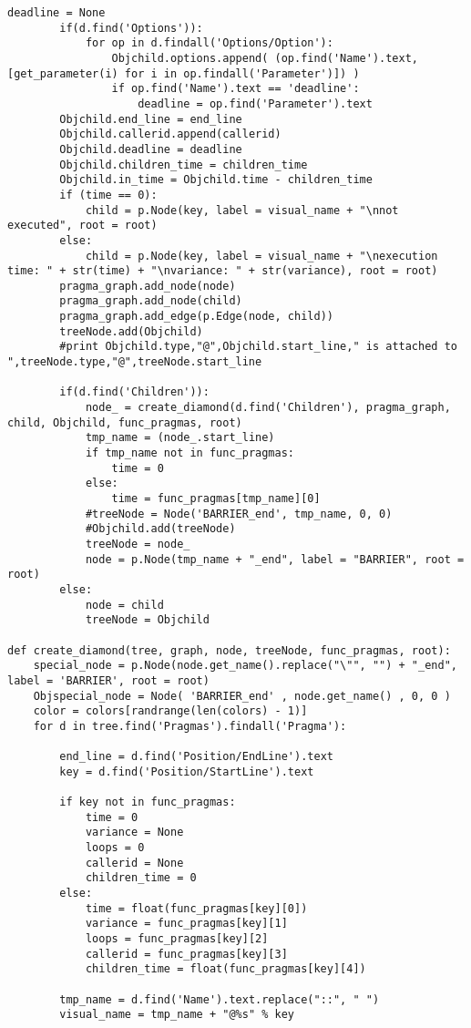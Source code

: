 \documentclass[a4paper,10pt,twoside]{book}
\begin{document}
\begin{lstlisting}[language=CCC, caption=pargraph.py]
		deadline = None
		if(d.find('Options')):
			for op in d.findall('Options/Option'):
				Objchild.options.append( (op.find('Name').text,[get_parameter(i) for i in op.findall('Parameter')]) )
				if op.find('Name').text == 'deadline':
					deadline = op.find('Parameter').text
		Objchild.end_line = end_line
		Objchild.callerid.append(callerid)
		Objchild.deadline = deadline
		Objchild.children_time = children_time
		Objchild.in_time = Objchild.time - children_time
		if (time == 0):
			child = p.Node(key, label = visual_name + "\nnot executed", root = root)
		else:
			child = p.Node(key, label = visual_name + "\nexecution time: " + str(time) + "\nvariance: " + str(variance), root = root)
		pragma_graph.add_node(node)
		pragma_graph.add_node(child)
		pragma_graph.add_edge(p.Edge(node, child))
		treeNode.add(Objchild)
		#print Objchild.type,"@",Objchild.start_line," is attached to ",treeNode.type,"@",treeNode.start_line

		if(d.find('Children')):
			node_ = create_diamond(d.find('Children'), pragma_graph, child, Objchild, func_pragmas, root)
			tmp_name = (node_.start_line)
			if tmp_name not in func_pragmas:
				time = 0
			else:
				time = func_pragmas[tmp_name][0]
			#treeNode = Node('BARRIER_end', tmp_name, 0, 0)
			#Objchild.add(treeNode)
			treeNode = node_
			node = p.Node(tmp_name + "_end", label = "BARRIER", root = root)
		else:
			node = child
			treeNode = Objchild

def create_diamond(tree, graph, node, treeNode, func_pragmas, root):
	special_node = p.Node(node.get_name().replace("\"", "") + "_end", label = 'BARRIER', root = root)
	Objspecial_node = Node( 'BARRIER_end' , node.get_name() , 0, 0 )
	color = colors[randrange(len(colors) - 1)]
	for d in tree.find('Pragmas').findall('Pragma'):

		end_line = d.find('Position/EndLine').text
		key = d.find('Position/StartLine').text

		if key not in func_pragmas:
			time = 0
			variance = None
			loops = 0
			callerid = None
			children_time = 0
		else:
			time = float(func_pragmas[key][0])
			variance = func_pragmas[key][1]
			loops = func_pragmas[key][2]
			callerid = func_pragmas[key][3]
			children_time = float(func_pragmas[key][4])

		tmp_name = d.find('Name').text.replace("::", " ")
		visual_name = tmp_name + "@%s" % key


\end{lstlisting}
\end{document}
